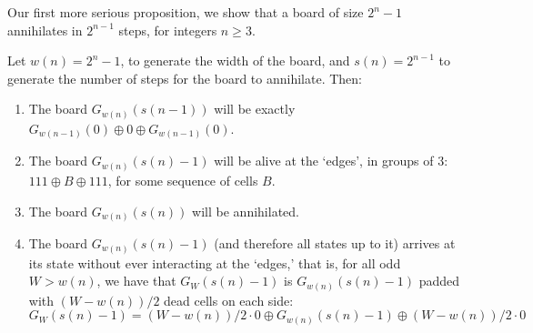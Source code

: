 \documentclass[12pt,letterpaper]{article}
\begin{document}
\noindent Our first more serious proposition, we show that a board of size $2^n-1$ annihilates in $2^{n-1}$ steps, for integers $n\geq 3$.
\begin{prop}\label{Power2} %
  Let $w(n)=2^n-1$, to generate the width of the board, and $s(n)=2^{n-1}$ to generate the number of steps for the board to annihilate. Then:\\
  \vspace*{-1.3em}
  \begin{enumerate}[label=(\alph*)]
    \item\label{a} The board $G_{w(n)}(s(n-1))$ will be exactly $G_{w(n-1)}(0)\oplus 0\oplus G_{w(n-1)}(0)$.
    \item\label{b} The board $G_{w(n)}(s(n)-1)$ will be alive at the `edges', in groups of 3: $111\oplus B\oplus 111$, for some sequence of cells $B$. 
    \item\label{c} The board $G_{w(n)}(s(n))$ will be annihilated.
    \item\label{d} The board $G_{w(n)}(s(n)-1)$ (and therefore all states up to it) arrives at its state without ever interacting at the `edges,' that is, for all odd $W>w(n)$, we have that $G_{W}(s(n)-1)$ is $G_{w(n)}(s(n)-1)$ padded with $(W-w(n))/2$ dead cells on each side: $$G_{W}(s(n)-1) = (W-w(n))/2\cdot 0 \oplus G_{w(n)}(s(n)-1) \oplus (W-w(n))/2\cdot 0$$
  \end{enumerate}
\end{prop}
\end{document}
